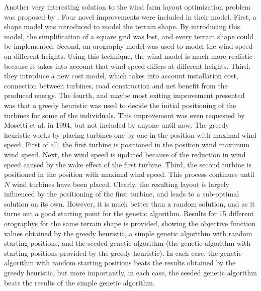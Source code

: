 \noindent Another very interesting solution to the wind farm layout optimization problem was proposed by \cite{Saavedra-Morena}. Four novel improvements were included in their model. First, a shape model was introduced to model the terrain shape. By introducing this model, the simplification of a square grid was lost, and every terrain shape could be implemented. Second, an orography model was used to model the wind speed on different heights. Using this technique, the wind model is much more realistic because it takes into account that wind speed differs at different heights. Third, they introduce a new cost model, which takes into account installation cost, connection between turbines, road construction and net benefit from the produced energy. The fourth, and maybe most exiting improvement presented  was that a greedy heuristic was used to decide the initial positioning of the turbines for some of the individuals. This improvement was even requested by Mosetti et al. in 1994, but not included by anyone until now. The greedy heuristic works by placing turbines one by one in the position with maximal wind speed. First of all, the first turbine is positioned in the position wind maximum wind speed. Next, the wind speed is updated because of the reduction in wind speed caused by the wake effect of the first turbine. Third, the second turbine is positioned in the position with maximal wind speed. This process continues until $N$ wind turbines have been placed. Clearly, the resulting layout is largely influenced by the positioning of the first turbine, and leads to a sub-optimal solution on its own. However, it is much better than a random solution, and as it turns out a good starting point for the genetic algorithm. Results for 15 different orographys for the same terrain shape is provided, showing the objective function values obtained by the greedy heuristic, a simple genetic algorithm with random starting positions, and the seeded genetic algorithm (the genetic algorithm with starting positions provided by the greedy heuristic). In each case, the genetic algorithm with random starting positions beats the results obtained by the greedy heuristic, but more importantly, in each case, the seeded genetic algorithm beats the results of the simple genetic algorithm. \\


